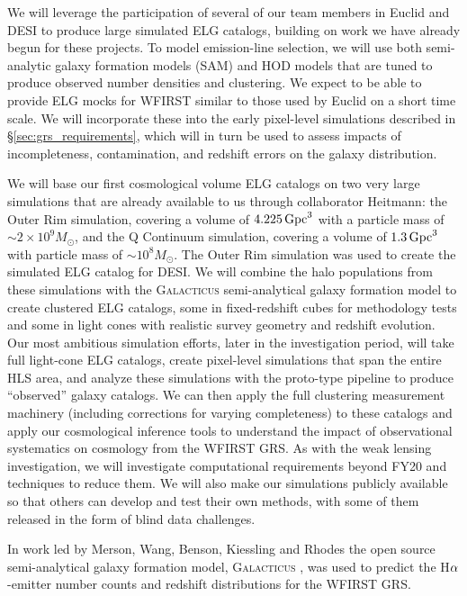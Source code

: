 We will leverage the participation of several of our team members in
Euclid and DESI to produce large simulated ELG catalogs,
building on work we have already begun for these projects.
To model emission-line selection, we will use both semi-analytic galaxy
formation models (SAM) and HOD models that are tuned to produce
observed number densities and clustering.
We expect to be able to provide ELG mocks for WFIRST similar to those used
by Euclid on a short time scale.
We will incorporate these into the early pixel-level
simulations described in \S\ref{sec:grs_requirements},
which will in turn be used to assess impacts of incompleteness,
contamination, and redshift errors on the galaxy distribution.

We will base our first cosmological volume ELG catalogs on two very large simulations
that are already available to us through collaborator Heitmann:
the Outer Rim simulation, covering
a volume of $4.225\,{\rm Gpc}^3$ with a particle mass of
$\sim 2\times 10^9 M_\odot$,
and the Q Continuum simulation, covering a volume of $1.3\,{\rm Gpc}^3$
with particle mass of $\sim 10^8 M_\odot$.
The Outer Rim simulation was used to create the simulated ELG
catalog for DESI.
We will combine the halo populations from these simulations with the
\textsc{Galacticus} semi-analytical galaxy formation model \cite{Benson2010,Benson2012} to create clustered ELG catalogs,
some in fixed-redshift cubes for methodology tests and some in light cones
with realistic survey geometry and redshift evolution.
Our most ambitious simulation efforts, later in the investigation
period, will take full light-cone ELG catalogs, create pixel-level
simulations that span the entire HLS area, and analyze these simulations
with the proto-type pipeline to produce ``observed'' galaxy catalogs.
We can then apply the full clustering measurement machinery
(including corrections for varying completeness) to these catalogs
and apply our cosmological inference tools
to understand the impact of observational systematics on
cosmology from the WFIRST GRS.
As with the weak lensing investigation, we will investigate computational
requirements beyond FY20 and techniques to reduce them. We will also make our
simulations publicly available so that others can develop and
test their own methods, with some of them released in the form of blind
data challenges.


 In work led
by Merson, Wang, Benson, Kiessling and Rhodes the open source
semi-analytical galaxy formation model, \textsc{Galacticus}
\cite{Benson2010,Benson2012}, was used to predict the H${\rm
  \alpha}$-emitter number counts and redshift distributions for the
WFIRST GRS.


